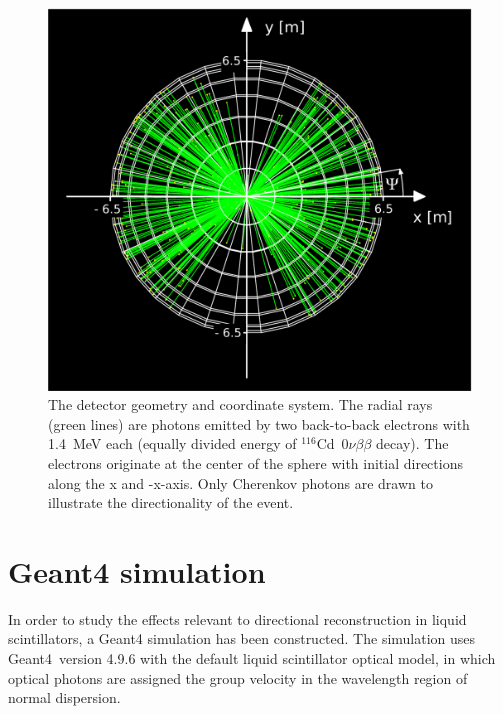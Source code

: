 \documentclass[cits]{JINST}
\begin{document}
\begin{figure}
        \begin{center}
        \includegraphics[scale=0.4]{graphs/geometry_plot_labels.pdf}
        \caption[]{The detector geometry and coordinate system.
        The radial rays (green lines) are photons emitted by two back-to-back electrons with 1.4~MeV each
        (equally divided energy of $^{116}$Cd~$0\nu\beta\beta$ decay). The electrons originate at
        the center of the sphere with initial directions along the x
        and -x-axis. Only Cherenkov photons are drawn to illustrate the
        directionality of the event. \label{detector_view}}
        \end{center}
\end{figure}



\section{Geant4 simulation}
\label{sim_section}
In order to study the effects relevant to directional reconstruction
in liquid scintillators, a Geant4\cite{geant4one,geant4two} simulation
has been constructed. The simulation uses Geant4~version 4.9.6 with the default liquid scintillator
optical model, in which optical photons are
assigned the group velocity in the wavelength region of normal
dispersion.
\end{document}
